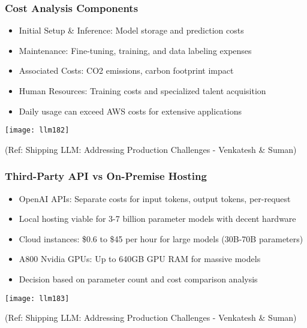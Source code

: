 \begin{frame}[fragile]\frametitle{Cost Analysis Components}
      \begin{itemize}
	\item Initial Setup \& Inference: Model storage and prediction costs
	\item Maintenance: Fine-tuning, training, and data labeling expenses
	\item Associated Costs: CO2 emissions, carbon footprint impact
	\item Human Resources: Training costs and specialized talent acquisition
	\item Daily usage can exceed AWS costs for extensive applications
	  \end{itemize}
	  
	\begin{center}
	\texttt{[image: llm182]}
	
	{\tiny (Ref: Shipping LLM: Addressing Production Challenges - Venkatesh \& Suman)}
	\end{center}   	  
\end{frame}

\begin{frame}[fragile]\frametitle{Third-Party API vs On-Premise Hosting}
      \begin{itemize}
	\item OpenAI APIs: Separate costs for input tokens, output tokens, per-request
	\item Local hosting viable for 3-7 billion parameter models with decent hardware
	\item Cloud instances: \$0.6 to \$45 per hour for large models (30B-70B parameters)
	\item A800 Nvidia GPUs: Up to 640GB GPU RAM for massive models
	\item Decision based on parameter count and cost comparison analysis
	  \end{itemize}

	\begin{center}
	\texttt{[image: llm183]}
	
	{\tiny (Ref: Shipping LLM: Addressing Production Challenges - Venkatesh \& Suman)}
	\end{center}   
\end{frame}

